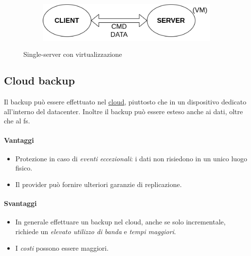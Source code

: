 \documentclass[11pt,a4paper,english]{article}
\begin{document}
\begin{figure}[H]
	\centering
	\begin{subfigure}{0.60\linewidth}
		\includegraphics[width=\linewidth]{../diagrams/architettura/2.png}
	\end{subfigure}
	\caption{Single-server con virtualizzazione}
\end{figure}



\subsection{Cloud backup}

\paragraph{} Il backup può essere effettuato nel \underline{cloud}, piuttosto che in un dispositivo dedicato all'interno del datacenter. Inoltre il backup può essere esteso anche ai dati, oltre che al fs. 

\paragraph{Vantaggi} \begin{itemize}
	\item Protezione in caso di \emph{eventi eccezionali}: i dati non risiedono in un unico luogo fisico.
	\item Il provider può fornire ulteriori garanzie di replicazione.
\end{itemize}

\paragraph{Svantaggi} \begin{itemize}
	\item In generale effettuare un backup nel cloud, anche se solo incrementale, richiede un \emph{elevato utilizzo di banda} e \emph{tempi maggiori}.
	\item I \emph{costi} possono essere maggiori.
\end{itemize}
\end{document}
